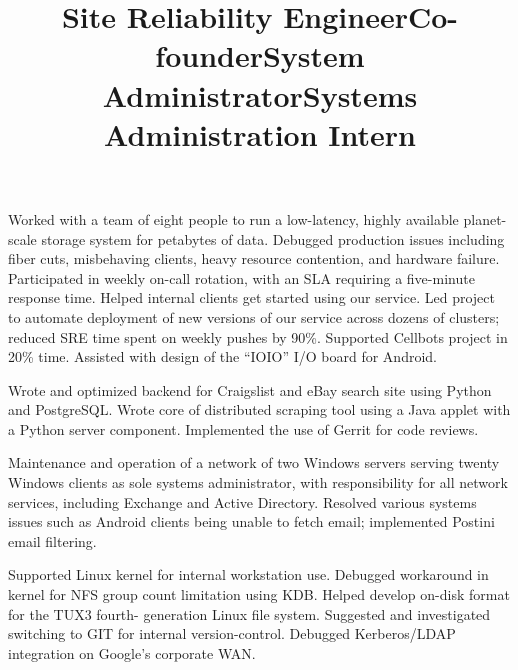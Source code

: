 \begin{resume}
\title{Site Reliability Engineer}
\begin{position}
  Worked with a team of eight people to run a low-latency, highly
  available planet-scale storage system for petabytes of data.
  Debugged production issues including fiber cuts, misbehaving
  clients, heavy resource contention, and hardware failure.
  Participated in weekly on-call rotation, with an SLA requiring a
  five-minute response time.  Helped internal clients get started
  using our service.  Led project to automate deployment of new
  versions of our service across dozens of clusters; reduced SRE time
  spent on weekly pushes by 90\%.  Supported Cellbots project in 20\%
  time.  Assisted with design of the ``IOIO'' I/O board for Android.
\end{position}

\title{Co-founder}
\begin{position}
  Wrote and optimized backend for Craigslist and eBay search site
  using Python and PostgreSQL.  Wrote core of distributed scraping
  tool using a Java applet with a Python server component.
  Implemented the use of Gerrit for code reviews.
\end{position}

\title{System Administrator}
\begin{position}
  Maintenance and operation of a network of two Windows servers
  serving twenty Windows clients as sole systems administrator, with
  responsibility for all network services, including Exchange and
  Active Directory.  Resolved various systems issues such as Android
  clients being unable to fetch email; implemented Postini email
  filtering.
\end{position}

\title{Systems Administration Intern}
\begin{position}
  Supported Linux kernel for internal workstation use.  Debugged
  workaround in kernel for NFS group count limitation using
  KDB. Helped develop on-disk format for the TUX3 fourth- generation
  Linux file system.  Suggested and investigated switching to GIT for
  internal version-control.  Debugged Kerberos/LDAP integration on
  Google’s corporate WAN.
\end{position}


\end{resume}
